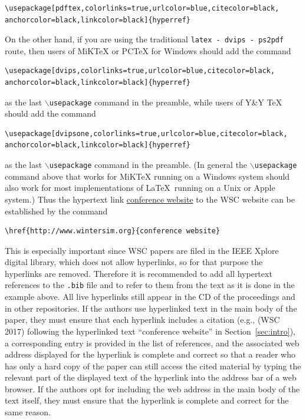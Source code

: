 \documentclass{wscpaperproc}
\theoremstyle{wsc}
\begin{document}
\begin{verbatim}
\usepackage[pdftex,colorlinks=true,urlcolor=blue,citecolor=black,
anchorcolor=black,linkcolor=black]{hyperref}
\end{verbatim}\vspace{5 mm}

\noindent On the other hand, if you are using the traditional {\tt latex - dvips - ps2pdf} route, then users of MiKTeX or PCTeX for Windows should add the command\newline


\begin{verbatim}
\usepackage[dvips,colorlinks=true,urlcolor=blue,citecolor=black,
anchorcolor=black,linkcolor=black]{hyperref}
\end{verbatim}\vspace{5 mm}


\noindent as the last {\tt $\backslash$usepackage} command in the preamble, while users of Y\&Y TeX should add the command\newline


\begin{verbatim}
\usepackage[dvipsone,colorlinks=true,urlcolor=blue,citecolor=black,
anchorcolor=black,linkcolor=black]{hyperref}
\end{verbatim}\vspace{5 mm}


\noindent as the last {\tt $\backslash$usepackage} command in the preamble.
(In general the {\tt $\backslash$usepackage} command above that works for MiKTeX running on a Windows system should also work for most implementations of \LaTeX\ running on a Unix or Apple system.)
Thus the hypertext link \href{http://www.wintersim.org}{conference website} \cite{WSC} to the WSC website can be established by the command\newline

\begin{verbatim}
\href{http://www.wintersim.org}{conference website}
\end{verbatim}\vspace{5 mm}


\noindent This is especially important since WSC papers are filed in the IEEE Xplore digital library, which does not allow hyperlinks, so for that purpose the hyperlinks are removed.
Therefore it is recommended to add all hypertext references to the {\tt .bib} file and to refer to them from the text as it is done in the example above.
All live hyperlinks still appear in the CD of the proceedings and in other repositories.
If the authors use hyperlinked text in the main body of the paper, they must ensure that each hyperlink includes a citation (e.g., (WSC 2017) following the hyperlinked text ``conference website'' in Section~\ref{sec:intro}), a corresponding entry is provided in the list of references, and the associated web address displayed for the hyperlink is complete and correct so that a reader who has only a hard copy of the paper can still access the cited material by typing the relevant part of the displayed text of the hyperlink into the address bar of a web browser.
If the authors opt for including the web address in the main body of the text itself, they must ensure that the hyperlink is complete and correct for the same reason.
\end{document}
